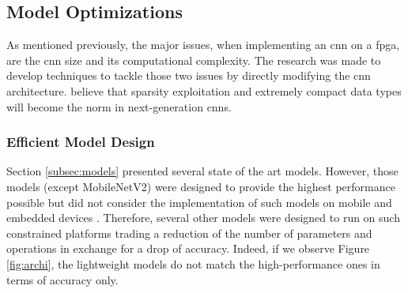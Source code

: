 \subsection{Model Optimizations} \label{subsec:mdopti}
As mentioned previously, the major issues, when implementing an \acrshort{cnn} on a \acrshort{fpga}, are the \acrshort{cnn} size and its computational complexity. The research was made to develop techniques to tackle those two issues by directly modifying the \acrshort{cnn} architecture. \textcite{nurvitadhi_can_2017} believe that sparsity exploitation and extremely compact data types will become the norm in next-generation \acrshort{cnn}s.
%
%
\subsubsection{Efficient Model Design}
%
Section \ref{subsec:models} presented several state of the art models. However, those models (except MobileNetV2) were designed to provide the highest performance possible but did not consider the implementation of such models on mobile and embedded devices \cite{iandola_squeezenet_2016}. Therefore, several other models were designed to run on such constrained platforms trading a reduction of the number of parameters and operations in exchange for a drop of accuracy. Indeed, if we observe Figure \ref{fig:archi}, the lightweight models do not match the high-performance ones in terms of accuracy only.

